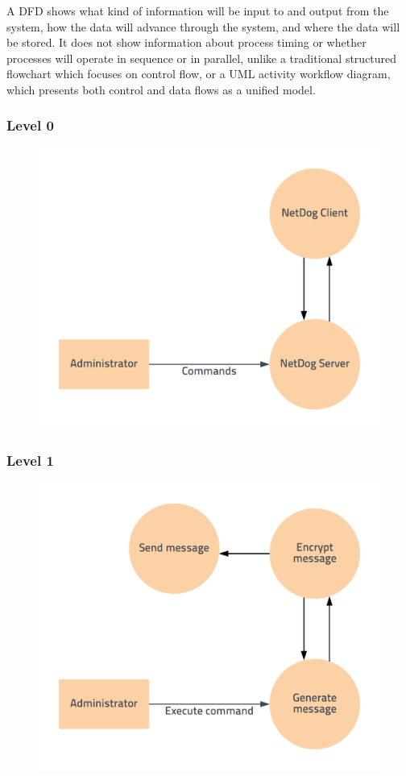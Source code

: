 A DFD shows what kind of information will be input to and output from the
system, how the data will advance through the system, and where the data will
be stored. It does not show information about process timing or whether
processes will operate in sequence or in parallel, unlike a traditional
structured flowchart which focuses on control flow, or a UML activity workflow
diagram, which presents both control and data flows as a unified model.

\subsubsection{Level 0}

\begin{figure}[H]
\includegraphics{dfd_level_0}
\end{figure}

\subsubsection{Level 1}

\begin{figure}[H]
\includegraphics{dfd_level_1}
\end{figure}

